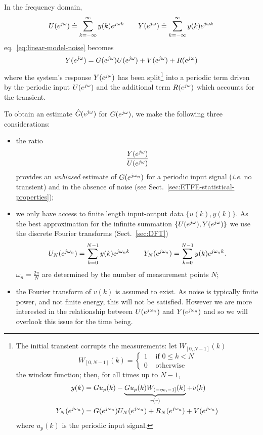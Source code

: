 In the frequency domain,
\begin{equation*}
  U(\ejw) \doteq \sum_{k=-\infty}^{\infty} y(k)e^{j\omega k} \hspace{2em} Y(\ejw) \doteq \sum_{k=-\infty}^{\infty} y(k)e^{j\omega k}
\end{equation*}
eq.~\eqref{eq:linear-model-noise} becomes
\begin{equation}
  \label{eq:model-frequency-domain}
  Y(\ejw) = G(\ejw)U(\ejw) + V(\ejw) + R(\ejw)
\end{equation}
where the system's response $Y(\ejw)$ has been split\footnote{The initial transient corrupts the measurements: let $W_{[0,N-1]}(k)$
  \begin{equation*}
    W_{[0,N-1]}(k) =
    \begin{cases}
      1 & \text{ if } 0\le k < N \\
      0 & \text{ otherwise}
    \end{cases}
  \end{equation*}
  the window function; then, for all times up to $N-1$,
  \begin{align*}
    y(k) &= Gu_p(k) - \underbrace{Gu_p(k)W_{(-\infty,-1]}(k)}_{r(r)} + v(k) \\
    Y_N(\ejwn) &= G(\ejwn)U_N(\ejwn) + R_N(\ejwn) + V(\ejwn)
  \end{align*}
  where $u_p(k)$ is the periodic input signal.} into a periodic term driven by the periodic input $U(\ejw)$ and the additional term $R(\ejw)$ which accounts for the transient.

To obtain an estimate $\hat{G}(\ejw)$ for $G(\ejw)$, we make the following three considerations:
\begin{itemize}
\item the ratio
  \begin{equation}
    \label{eq:EFTE}
    \frac{Y(\ejw)}{U(\ejw)}
  \end{equation}
  provides an \emph{unbiased} estimate of $G(\ejwn)$ for a periodic input signal (\textit{i.e.} no transient) and in the absence of noise (see Sect.~\ref{sec:ETFE-statistical-properties});
\item we only have access to finite length input-output data $\{u(k),y(k)\}$. As the best approximation for the infinite summation $\{U(\ejw), Y(\ejw)\}$ we use the discrete Fourier transforms (Sect.~\ref{sec:DFT})
  \begin{equation*}
    U_N(\ejwn) = \sum_{k=0}^{N-1} y(k)\ejwn[k] \hspace{2em} Y_N(\ejwn) = \sum_{k=0}^{N-1} y(k)\ejwn[k].
  \end{equation*}
  $\omega_n=\frac{2\pi}{N}$ are determined by the number of measurement points $N$;
\item the Fourier transform of $v(k)$ is assumed to exist. As noise is typically finite power, and not finite energy, this will not be satisfied. However we are more interested in the relationship between $U(\ejwn)$ and $Y(\ejwn)$ and so we will overlook this issue for the time being.
\end{itemize}

